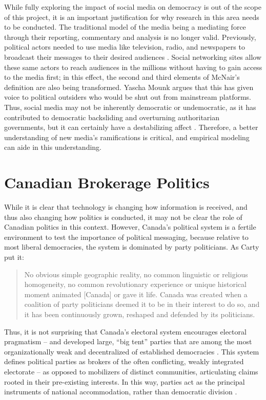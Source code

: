 While fully exploring the impact of social media on democracy is out of the
scope of this project, it is an important justification for why research in this
area needs to be conducted. The traditional model of the media being a mediating
force through their reporting, commentary and analysis is no longer valid.
Previously, political actors needed to use media like television, radio, and
newspapers to broadcast their messages to their desired audiences
\cite{mcnair2017introduction}. Social networking sites allow these same actors
to reach audiences in the millions without having to gain access to the media
first; in this effect, the second and third elements of McNair’s definition are
also being transformed. Yascha Mounk argues that this has given voice to
political outsiders who would be shut out from mainstream platforms. Thus,
social media may not be inherently democratic or undemocratic, as it has
contributed to democratic backsliding and overturning authoritarian governments,
but it can certainly have a destabilizing affect \cite{mounk2018people}.
Therefore, a better understanding of new media’s ramifications is critical, and
empirical modeling can aide in this understanding.

\section{Canadian Brokerage Politics}

While it is clear that technology is changing how information is received, and
thus also changing how politics is conducted, it may not be clear the role of
Canadian politics in this context. However, Canada’s political system is a
fertile environment to test the importance of political messaging, because
relative to most liberal democracies, the system is dominated by party
politicians. As Carty put it:

\begin{quote}
No obvious simple geographic reality, no common linguistic or religious
homogeneity, no common revolutionary experience or unique historical moment
animated [Canada] or gave it life. Canada was created when a coalition of party
politicians deemed it to be in their interest to do so, and it has been
continuously grown, reshaped and defended by its politicians.
\cite{carty2010political}
\end{quote}

Thus, it is not surprising that Canada’s electoral system encourages electoral
pragmatism -- and developed large, “big tent” parties that are among the most
organizationally weak and decentralized of established democracies
\cite{carty2010political}. This system defines political parties as brokers of
the often conflicting, weakly integrated electorate -- as opposed to mobilizers
of distinct communities, articulating claims rooted in their pre-existing
interests. In this way, parties act as the principal instruments of national
accommodation, rather than democratic division \cite{carty2010political}.

